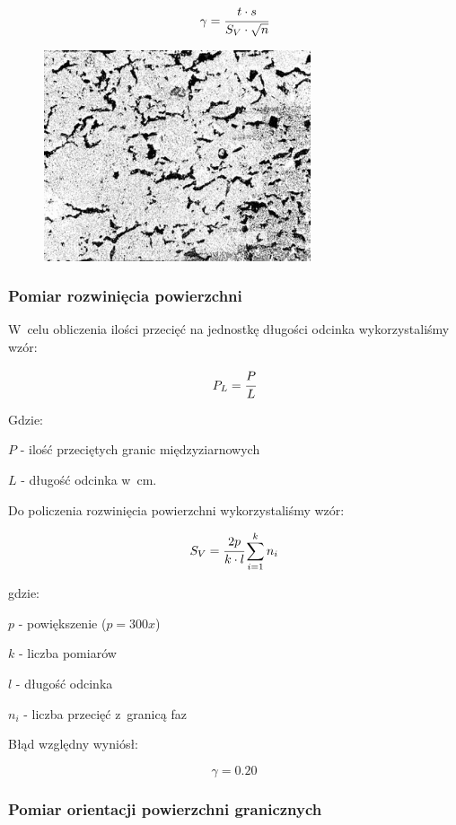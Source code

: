 \documentclass[a4paper,12pt]{article}
\begin{document}
$$\gamma=\cfrac{t\cdot s}{S_V\cdot \sqrt{n}}$$

\begin{figure}[H]
    \centering
    \includegraphics[width=0.7\textwidth]{img/SV.png}
\end{figure}


\subsubsection{Pomiar rozwinięcia powierzchni}

W~celu obliczenia ilości przecięć na jednostkę długości odcinka wykorzystaliśmy wzór:

$$P_L=\cfrac{P}{L}$$

Gdzie:

$P$ - ilość przeciętych granic międzyziarnowych

$L$ - długość odcinka w~cm.

Do policzenia rozwinięcia powierzchni wykorzystaliśmy wzór:

$$S_V=\cfrac{2p}{k\cdot l} \sum ^k_{i=1}n_i$$

gdzie:

{\color{purple}$p$ - powiększenie ($p=300x$)}

$k$ - liczba pomiarów

$l$ - długość odcinka

$n_i$ - liczba przecięć z~granicą faz


\newpage

Błąd względny wyniósł:

$$\gamma=0.20$$

\subsubsection{Pomiar orientacji powierzchni granicznych}
\end{document}
